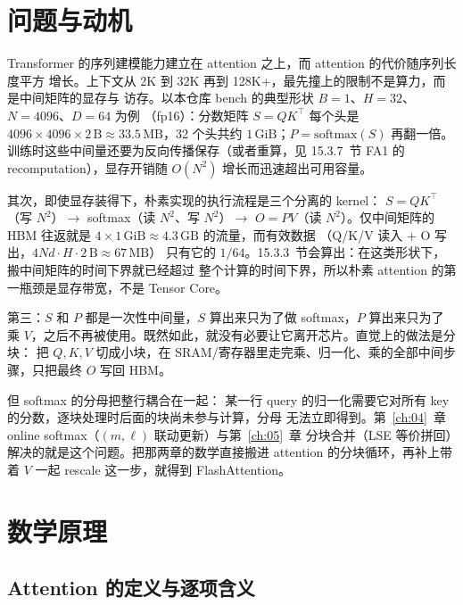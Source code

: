\section{问题与动机}

Transformer 的序列建模能力建立在 attention 之上，而 attention 的代价随序列长度平方
增长。上下文从 2K 到 32K 再到 128K+，最先撞上的限制不是算力，而是中间矩阵的显存与
访存。以本仓库 bench 的典型形状 $B{=}1$、$H{=}32$、$N{=}4096$、$D{=}64$ 为例
（fp16）：分数矩阵 $S = QK^{\top}$ 每个头是 $4096 \times 4096 \times 2\,\mathrm{B}
\approx 33.5\,\mathrm{MB}$，32 个头共约 $1\,\mathrm{GiB}$；$P = \mathrm{softmax}(S)$
再翻一倍。训练时这些中间量还要为反向传播保存（或者重算，见 15.3.7~节 FA1 的
recomputation），显存开销随 $O(N^{2})$ 增长而迅速超出可用容量。

其次，即使显存装得下，朴素实现的执行流程是三个分离的 kernel：
$S = QK^{\top}$（写 $N^2$）$\to$ softmax（读 $N^2$、写 $N^2$）$\to$
$O = PV$（读 $N^2$）。仅中间矩阵的 HBM 往返就是
$4 \times 1\,\mathrm{GiB} \approx 4.3\,\mathrm{GB}$ 的流量，而有效数据
（Q/K/V 读入 + O 写出，$4Nd \cdot H \cdot 2\,\mathrm{B} \approx 67\,\mathrm{MB}$）
只有它的 $1/64$。15.3.3~节会算出：在这类形状下，搬中间矩阵的时间下界就已经超过
整个计算的时间下界，所以朴素 attention 的第一瓶颈是显存带宽，不是 Tensor Core。

第三：$S$ 和 $P$ 都是一次性中间量，$S$ 算出来只为了做 softmax，$P$ 算出来只为了
乘 $V$，之后不再被使用。既然如此，就没有必要让它离开芯片。直觉上的做法是分块：
把 $Q,K,V$ 切成小块，在 SRAM/寄存器里走完乘、归一化、乘的全部中间步骤，只把最终
$O$ 写回 HBM。

但 softmax 的分母把整行耦合在一起：
某一行 query 的归一化需要它对所有 key 的分数，逐块处理时后面的块尚未参与计算，分母
无法立即得到。第~\ref{ch:04}~章 online softmax（$(m,\ell)$ 联动更新）与第~\ref{ch:05}~章
分块合并（LSE 等价拼回）解决的就是这个问题。把那两章的数学直接搬进
attention 的分块循环，再补上带着 $V$ 一起 rescale 这一步，就得到 FlashAttention。

\section{数学原理}

\subsection{Attention 的定义与逐项含义}

